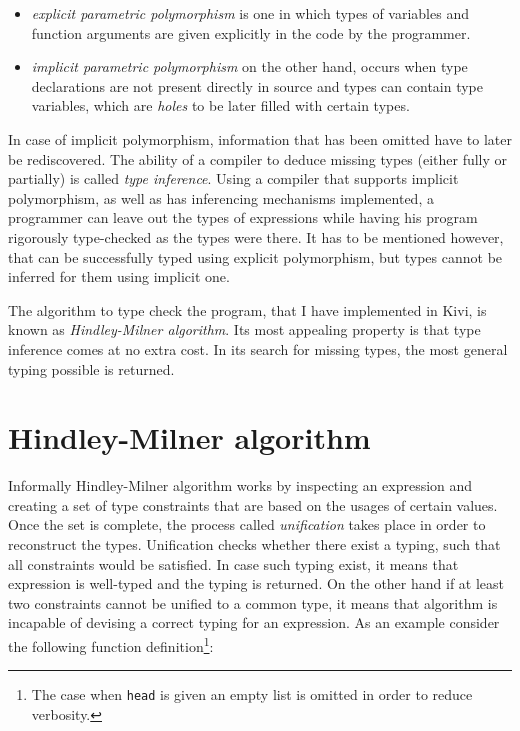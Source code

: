 \documentclass[12pt,a4paper]{report}
\begin{document}
\begin{itemize}
  \item \textit{explicit parametric polymorphism} is one in which types of
    variables and function arguments are given explicitly in the code by the
    programmer.
  \item \textit{implicit parametric polymorphism} on the other hand, occurs
    when type declarations are not present directly in source and types can
    contain type variables, which are \textit{holes} to be later filled with certain
    types.
\end{itemize}

In case of implicit polymorphism, information that has been omitted have to
later be rediscovered. The ability of a compiler to deduce missing types
(either fully or partially) is called \textit{type inference}. Using a compiler
that supports implicit polymorphism, as well as has inferencing mechanisms
implemented, a programmer can leave out the types of expressions while having
his program rigorously type-checked as the types were there. It has to be
mentioned however, that can be successfully typed using explicit polymorphism,
but types cannot be inferred for them using implicit one.

The algorithm to type check the program, that I have implemented in Kivi, is
known as \textit{Hindley-Milner algorithm}. Its most appealing property is that
type inference comes at no extra cost. In its search for missing types, the
most general typing possible is returned.

\section{Hindley-Milner algorithm}
Informally Hindley-Milner algorithm works by inspecting an expression and
creating a set of type constraints that are based on the usages of certain
values. Once the set is complete, the process called \textit{unification} takes
place in order to reconstruct the types. Unification checks whether there exist
a typing, such that all constraints would be satisfied. In case such typing
exist, it means that expression is well-typed and the typing is returned.
On the other hand if at least two constraints cannot be unified to a common
type, it means that algorithm is incapable of devising a correct typing for an
expression. As an example consider the following function
definition\footnote{The case when \texttt{head} is given an empty list is
omitted in order to reduce verbosity.}:
\end{document}
